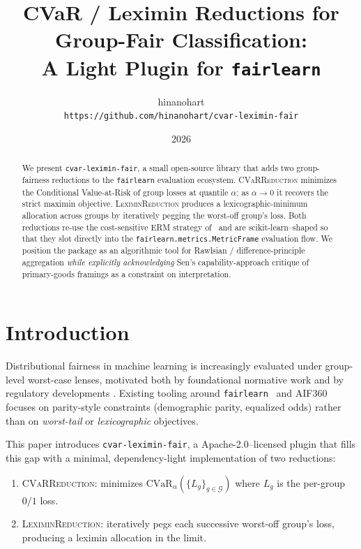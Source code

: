\documentclass[11pt]{article}
\title{CVaR / Leximin Reductions for Group-Fair Classification:\\
       A Light Plugin for \texttt{fairlearn}}
\author{hinanohart\\
        \texttt{https://github.com/hinanohart/cvar-leximin-fair}}
\date{2026}
\begin{document}
\maketitle

\begin{abstract}
We present \texttt{cvar-leximin-fair}, a small open-source library that adds
two group-fairness reductions to the \texttt{fairlearn} evaluation ecosystem.
\textsc{CVaRReduction} minimizes the Conditional Value-at-Risk of group losses
at quantile $\alpha$; as $\alpha \to 0$ it recovers the strict maximin objective.
\textsc{LeximinReduction} produces a lexicographic-minimum allocation across
groups by iteratively pegging the worst-off group's loss. Both reductions
re-use the cost-sensitive ERM strategy of~\citet{agarwal2018reductions} and
are scikit-learn--shaped so that they slot directly into the
\texttt{fairlearn.metrics.MetricFrame} evaluation flow. We position the
package as an algorithmic tool for Rawlsian / difference-principle aggregation
\emph{while explicitly acknowledging} Sen's capability-approach critique of
primary-goods framings as a constraint on interpretation.
\end{abstract}

\section{Introduction}
Distributional fairness in machine learning is increasingly evaluated under
group-level worst-case lenses, motivated both by foundational normative work
\citep{rawls1971theory, sen1979equality} and by regulatory developments
\citep{euaiact2024, nyc_ll144_2023}. Existing tooling around
\texttt{fairlearn}~\citep{bird2020fairlearn} and AIF360~\citep{bellamy2018aif360}
focuses on parity-style constraints (demographic parity, equalized odds)
rather than on \emph{worst-tail} or \emph{lexicographic} objectives.

This paper introduces \texttt{cvar-leximin-fair}, a Apache-2.0--licensed
plugin that fills this gap with a minimal, dependency-light implementation
of two reductions:
\begin{enumerate}
\item \textsc{CVaRReduction}: minimizes
$\mathrm{CVaR}_{\alpha}\!\left( \{ L_g \}_{g \in \mathcal{G}} \right)$
where $L_g$ is the per-group $0/1$ loss.
\item \textsc{LeximinReduction}: iteratively pegs each successive worst-off
group's loss, producing a leximin allocation in the limit.
\end{enumerate}
\end{document}
